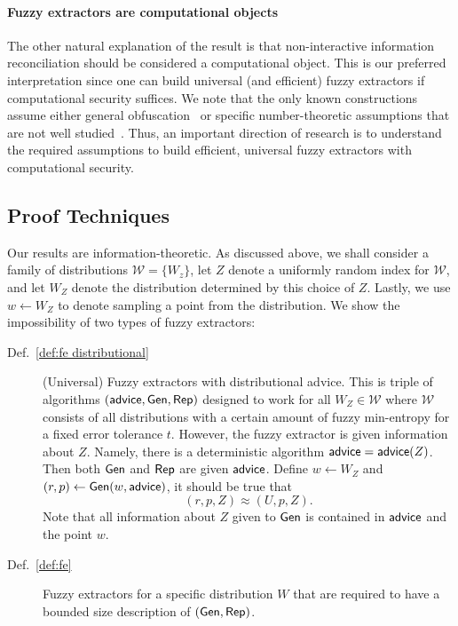 \paragraph{Fuzzy extractors are computational objects} The other
natural explanation of the result is that non-interactive information
reconciliation should be considered a computational object. This is
our preferred interpretation since one can build universal (and
efficient) fuzzy extractors if computational security suffices.  We
note that the only known constructions assume either general
obfuscation~\cite{BarakBCKPS13,BitanskyCKP14,bitansky2017virtual} or
specific number-theoretic assumptions that are not well
studied~\cite{galbraith2019obfuscated}. Thus, an important direction
of research is to understand the required assumptions to build
efficient, universal fuzzy extractors with computational security.


\subsection{Proof Techniques}
Our results are information-theoretic. As discussed above, we shall
consider a family of distributions $\mathcal{W} = \{ W_z \}$, let $Z$
denote a uniformly random index for $\mathcal{W}$, and let $W_Z$
denote the distribution determined by this choice of $Z$.
Lastly, we use $w\leftarrow W_Z$ to
denote sampling a point from the distribution.  We show the
impossibility of two types of fuzzy extractors:
\begin{description}
\item[Def.~\ref{def:fe distributional}] (Universal) Fuzzy extractors with distributional advice.  This is triple of algorithms $({\mathsf{advice}}, {\mathsf{Gen}}, {\mathsf{Rep}})$ designed to work for all $W_Z \in \mathcal{W}$ where $\mathcal{W}$ consists of all distributions with a certain amount of fuzzy min-entropy for a fixed error tolerance $t$.  However, the fuzzy extractor is given information about $Z$.  Namely, there is a deterministic algorithm ${\mathsf{advice}} = {\mathsf{advice}}(Z)$. Then both ${\mathsf{Gen}}$ and ${\mathsf{Rep}}$ are given ${\mathsf{advice}}$. Define $w\leftarrow W_Z$ and $(r, p) \leftarrow {\ensuremath{\mathsf{Gen}}}(w, {\mathsf{advice}})$, it should be true that 
\[
(r, p, Z) \approx (U, p, Z).
\]
Note that all information about $Z$ given to ${\mathsf{Gen}}$ is contained in ${\mathsf{advice}}$ and the point $w$.
\item[Def.~\ref{def:fe}] Fuzzy extractors for a specific distribution $W$ that are required to have a bounded size description of $({\mathsf{Gen}}, {\mathsf{Rep}})$.
\end{description}

